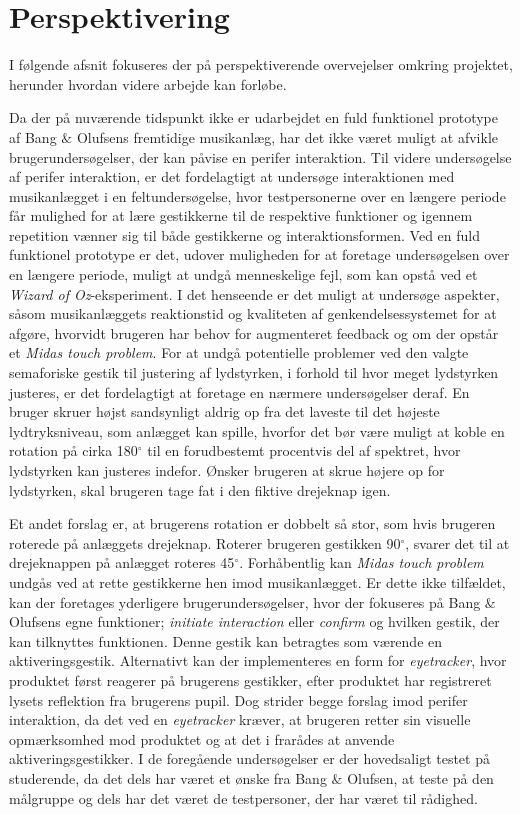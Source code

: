 \chapter{Perspektivering}
\label{Perspektivering}
%
I følgende afsnit fokuseres der på perspektiverende overvejelser omkring projektet, herunder hvordan videre arbejde kan forløbe.

Da der på nuværende tidspunkt ikke er udarbejdet en fuld funktionel prototype af Bang $\&$ Olufsens fremtidige musikanlæg, har det ikke været muligt at afvikle brugerundersøgelser, der kan påvise en perifer interaktion. Til videre undersøgelse af perifer interaktion, er det fordelagtigt at undersøge interaktionen med musikanlægget i en feltundersøgelse, hvor testpersonerne over en længere periode får mulighed for at lære gestikkerne til de respektive funktioner og igennem repetition vænner sig til både gestikkerne og interaktionsformen. Ved en fuld funktionel prototype er det, udover muligheden for at foretage undersøgelsen over en længere periode, muligt at undgå menneskelige fejl, som kan opstå ved et \textit{Wizard of Oz}-eksperiment. I det henseende er det muligt at undersøge aspekter, såsom musikanlæggets reaktionstid og kvaliteten af genkendelsessystemet for at afgøre, hvorvidt brugeren har behov for augmenteret feedback og om der opstår et \textit{Midas touch problem}.\blankline
%
For at undgå potentielle problemer ved den valgte semaforiske gestik til justering af lydstyrken, i forhold til hvor meget lydstyrken justeres, er det fordelagtigt at foretage en nærmere undersøgelser deraf. En bruger skruer højst sandsynligt aldrig op fra det laveste til det højeste lydtryksniveau, som anlægget kan spille, hvorfor det bør være muligt at koble en rotation på cirka 180$^{\circ}$ til en forudbestemt procentvis del af spektret, hvor lydstyrken kan justeres indefor. Ønsker brugeren at skrue højere op for lydstyrken, skal brugeren tage fat i den fiktive drejeknap igen. 

Et andet forslag er, at brugerens rotation er dobbelt så stor, som hvis brugeren roterede på anlæggets drejeknap. Roterer brugeren gestikken 90$^{\circ}$, svarer det til at drejeknappen på anlægget roteres 45$^{\circ}$.\blankline 
%
Forhåbentlig kan \textit{Midas touch problem} undgås ved at rette gestikkerne hen imod musikanlægget. Er dette ikke tilfældet, kan der foretages yderligere brugerundersøgelser, hvor der fokuseres på Bang $\&$ Olufsens egne funktioner; \textit{initiate interaction} eller \textit{confirm} og hvilken gestik, der kan tilknyttes funktionen. Denne gestik kan betragtes som værende en aktiveringsgestik. Alternativt kan der implementeres en form for \textit{eyetracker}, hvor produktet først reagerer på brugerens gestikker, efter produktet har registreret lysets reflektion fra brugerens pupil. Dog strider begge forslag imod perifer interaktion, da det ved en \textit{eyetracker} kræver, at brugeren retter sin visuelle opmærksomhed mod produktet og at det i  frarådes at anvende aktiveringsgestikker.\blankline   
%
I de foregående undersøgelser er der hovedsaligt testet på studerende, da det dels har været et ønske fra Bang $\&$ Olufsen, at teste på den målgruppe og dels har det været de testpersoner, der har været til rådighed. 

